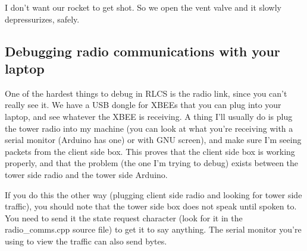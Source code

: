 \documentclass[11pt]{article}
\begin{document}
I don't want our rocket to get shot. So we open the vent valve and it
slowly depressurizes, safely.

\subsection{Debugging radio communications with your laptop}
\label{sec:org813ea8c}

One of the hardest things to debug in RLCS is the radio link, since you
can't really see it. We have a USB dongle for XBEEs that you can plug into
your laptop, and see whatever the XBEE is receiving. A thing I'll usually
do is plug the tower radio into my machine (you can look at what you're
receiving with a serial monitor (Arduino has one) or with GNU screen), and
make sure I'm seeing packets from the client side box. This proves that the
client side box is working properly, and that the problem (the one I'm
trying to debug) exists between the tower side radio and the tower side
Arduino.

If you do this the other way (plugging client side radio and looking for
tower side traffic), you should note that the tower side box does not speak
until spoken to. You need to send it the state request character (look for
it in the radio\_comms.cpp source file) to get it to say anything. The
serial monitor you're using to view the traffic can also send bytes.
\end{document}

